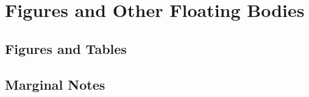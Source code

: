 \section{Figures and Other Floating Bodies}
\subsection{Figures and Tables}


\subsection{Marginal Notes}